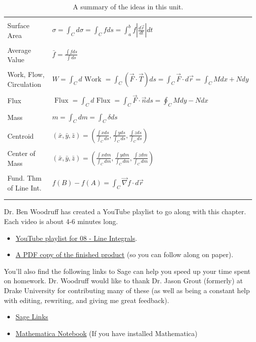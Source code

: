 \documentclass[10pt,]{book}
\theoremstyle{plain}
\theoremstyle{definition}
\theoremstyle{definition}
\theoremstyle{definition}
\theoremstyle{definition}
\theoremstyle{definition}
\numberwithin{equation}{section}
\newcommand{\hrulethin}  {\noalign{\hrule height 0.04em}}
\newcommand{\hrulemedium}{\noalign{\hrule height 0.07em}}
\begin{document}
\begin{table}
\centering
\begin{tabular}{ll}
&\tabularnewline\hrulethin
Surface Area&\(\sigma = \int_C d\sigma=\int_C f ds = \int_a^b f \left|\frac{d\vec r}{dt}\right|dt\)\tabularnewline[0pt]
&\tabularnewline\hrulethin
Average Value&\(\bar f = \frac{\int f ds}{\int ds}\)\tabularnewline[0pt]
&\tabularnewline\hrulethin
Work, Flow, Circulation&\(W=\int_C d\text{ Work }  = \int_C (\vec F\cdot \vec T) ds = \int_C \vec F\cdot d\vec r = \int_C Mdx+Ndy\)\tabularnewline[0pt]
&\tabularnewline\hrulethin
Flux&\(\text{ Flux }  = \int_C d\text{ Flux }  = \int_C \vec F\cdot \vec n ds = \oint_C Mdy-Ndx\)\tabularnewline[0pt]
&\tabularnewline\hrulethin
Mass&\(m=\int_C dm = \int_C \delta ds\)\tabularnewline[0pt]
&\tabularnewline\hrulethin
Centroid&\(\left(\bar x,\bar y,\bar z\right) =\left(\frac{\int x ds}{\int_C ds},\frac{\int y ds}{\int_C ds},\frac{\int z ds}{\int_C ds}\right)\)\tabularnewline[0pt]
&\tabularnewline\hrulethin
Center of Mass&\(\left(\bar x,\bar y,\bar z\right) =\left(\frac{\int x dm}{\int_C dm},\frac{\int y dm}{\int_C dm},\frac{\int z dm}{\int_C dm}\right)\)\tabularnewline[0pt]
&\tabularnewline\hrulemedium
Fund. Thm of Line Int.&\(f(B)-f(A)=\int_C \vec \nabla f \cdot d\vec r\)\tabularnewline[0pt]
&\tabularnewline\hrulethin
\end{tabular}
\caption{A summary of the ideas in this unit.\label{line_integral_summary}}
\end{table}
Dr. Ben Woodruff has created a YouTube playlist to go along with this chapter. Each video is about 4-6 minutes long. \leavevmode%
\begin{itemize}[label=\textbullet]
\item{}\href{http://www.youtube.com/playlist?list=PL04DF68E73B7ECD54}{YouTube playlist for 08 - Line Integrals}.%
\item{}\href{http://db.tt/dAFBcMB7}{A PDF copy of the finished product} (so you can follow along on paper).%
\end{itemize}
%
\par
You'll also find the following links to Sage can help you speed up your time spent on homework. Dr. Woodruff would like to thank Dr. Jason Grout (formerly) at Drake University for contributing many of these (as well as being a constant help with editing, rewriting, and giving me great feedback). \leavevmode%
\begin{itemize}[label=\textbullet]
\item{}\href{http://bmw.byuimath.com/dokuwiki/doku.php?id=sage_links}{Sage Links}%
\item{}\href{https://content.byui.edu/file/3e8d885f-db47-4e74-9e04-c3d72627c835/1/_zips/215-Tech-Introduction.zip}{Mathematica Notebook} (If you have installed Mathematica)%
\end{itemize}
\end{document}
